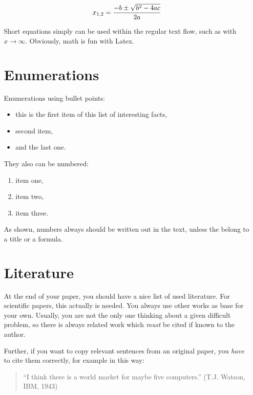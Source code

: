\documentclass[A4,10pt]{article}
\begin{document}
\begin{displaymath}
x_{1,2} = \frac{-b \pm \sqrt{b^2-4ac}}{2a}\\
\end{displaymath}

Short equations simply can be used within the regular text flow, such
as with $x \to \infty$. Obviously, math is fun with Latex.


\section{Enumerations}

Enumerations using bullet points:

\begin{itemize}
	\item this is the first item of this list of interesting facts,
	\item second item,
	\item and the last one.
\end{itemize}

They also can be numbered:

\begin{enumerate}
	\item item one,
	\item item two,
	\item item three.
\end{enumerate}

As shown, numbers always should be written out in the text, unless the
belong to a title or a formula.

\section{Literature}

At the end of your paper, you should have a nice list of used
literature. For scientific papers, this actually is needed. You always
use other works as base for your own. Usually, you are not the only
one thinking about a given difficult problem, so there is always
related work which {\em must} be cited if known to the author.

Further, if you want to copy relevant sentences from an
original paper, you {\em have} to cite them correctly, for example
in this way:

\begin{quote}
	``I think there is a world market for maybe five computers.''
	(T.J. Watson, IBM, 1943)
\end{quote}
\end{document}
